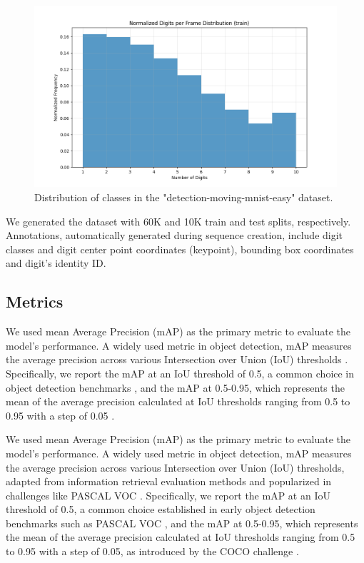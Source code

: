 \begin{figure}
    \centering
    \includegraphics[width=\textwidth]{figures/figure_method_dataset_train_digits_per_frame.png}
    \caption{Distribution of classes in the "detection-moving-mnist-easy" dataset.}
    \label{fig:figure_method_dataset_train_digits_per_frame}
\end{figure}

We generated the dataset with 60K and 10K train and test splits, respectively. Annotations, automatically generated during sequence creation, include digit classes and digit center point coordinates (keypoint), bounding box coordinates and digit's identity ID.

\subsection{Metrics} \label{Methods:Metrics}

We used mean Average Precision (mAP) as the primary metric to evaluate the model's performance. A widely used metric in object detection, mAP measures the average precision across various Intersection over Union (IoU) thresholds \cite{}. Specifically, we report the mAP at an IoU threshold of 0.5, a common choice in object detection benchmarks \cite{}, and the mAP at 0.5-0.95, which represents the mean of the average precision calculated at IoU thresholds ranging from 0.5 to 0.95 with a step of 0.05 \cite{}.

We used mean Average Precision (mAP) as the primary metric to evaluate the model's performance. A widely used metric in object detection, mAP measures the average precision across various Intersection over Union (IoU) thresholds, adapted from information retrieval evaluation methods and popularized in challenges like PASCAL VOC \cite{everinghamPascalVisualObject2010}. Specifically, we report the mAP at an IoU threshold of 0.5, a common choice established in early object detection benchmarks such as PASCAL VOC \cite{everinghamPascalVisualObject2010}, and the mAP at 0.5-0.95, which represents the mean of the average precision calculated at IoU thresholds ranging from 0.5 to 0.95 with a step of 0.05, as introduced by the COCO challenge \cite{linMicrosoftCOCOCommon2015a}.

